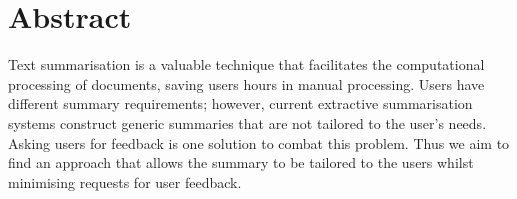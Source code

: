 \documentclass[ %
                    author={James Stephenson},
                supervisor={Dr. Edwin Simpson},
                    degree={MSc},
                     title={PROJECT PLAN},
                  subtitle={Bayesian Deep Learning For Extractive Test Summarisation},
                      type={},
                      year={2022}]{../additions/dissertation}
\begin{document}
	
	
	
	
	
	\maketitle
	
	
	\frontmatter
	
	
	
	
	
	\chapter*{Abstract}		

		Text summarisation is a valuable technique that facilitates the computational processing of documents, saving users hours in manual processing. Users have different summary requirements; however, current extractive summarisation systems construct generic summaries that are not tailored to the user's needs. Asking users for feedback is one solution to combat this problem. Thus we aim to find an approach that allows the summary to be tailored to the users whilst minimising requests for user feedback.
\end{document}
